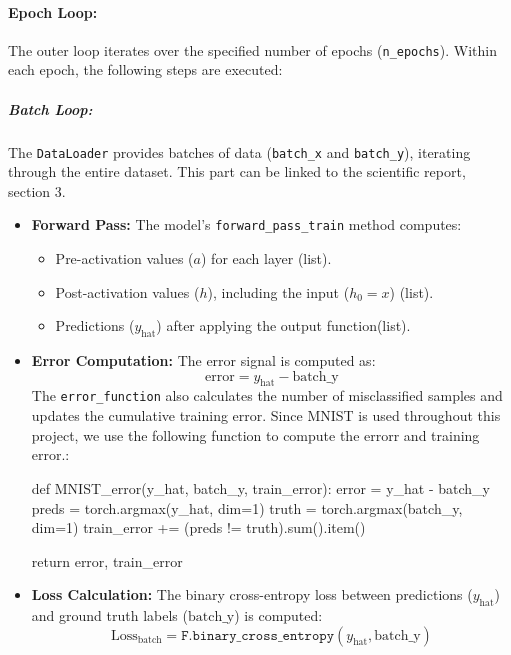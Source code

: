 \documentclass[english]{article}
\begin{document}
\paragraph{Epoch Loop:}
The outer loop iterates over the specified number of epochs (\texttt{n\_epochs}). Within each epoch, the following steps are executed:

\subparagraph{Batch Loop:}
The \texttt{DataLoader} provides batches of data (\texttt{batch\_x} and \texttt{batch\_y}), iterating through the entire dataset. This part can be linked to the scientific report, section 3.

\begin{itemize}
    \item \textbf{Forward Pass:}
    The model's \texttt{forward\_pass\_train} method computes:
    \begin{itemize}
        \item Pre-activation values (\(a\)) for each layer (list).
        \item Post-activation values (\(h\)), including the input (\(h_0 = x\)) (list).
        \item Predictions (\(y_{\text{hat}}\)) after applying the output function(list).

    \end{itemize}

    \item \textbf{Error Computation:}
    The error signal is computed as:
    \[
    \text{error} = y_{\text{hat}} - \text{batch\_y}
    \]
    The \texttt{error\_function} also calculates the number of misclassified samples and updates the cumulative training error.
    Since MNIST is used throughout this project, we use the following function to compute the errorr and training error.:
    \begin{python}
def MNIST_error(y_hat, batch_y, train_error):
    error = y_hat - batch_y
    preds = torch.argmax(y_hat, dim=1)
    truth = torch.argmax(batch_y, dim=1)
    train_error += (preds != truth).sum().item()

    return error, train_error
    \end{python}

    \item \textbf{Loss Calculation:}
    The binary cross-entropy loss between predictions (\(y_{\text{hat}}\)) and ground truth labels (\(\text{batch\_y}\)) is computed:
    \[
    \text{Loss}_{\text{batch}} = \texttt{F.binary\_cross\_entropy}(y_{\text{hat}}, \text{batch\_y})
    \]


\end{itemize}
\end{document}
